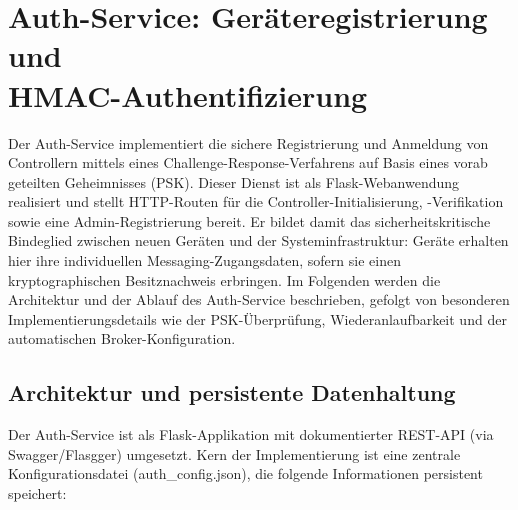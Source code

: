 \section{Auth-Service: Geräteregistrierung und \\HMAC-Authentifizierung}
Der Auth-Service implementiert die sichere Registrierung und Anmeldung von Controllern mittels eines Challenge-Response-Verfahrens auf Basis eines vorab geteilten Geheimnisses (PSK). Dieser Dienst ist als Flask-Webanwendung realisiert und stellt HTTP-Routen für die Controller-Initialisierung, -Verifikation sowie eine Admin-Registrierung bereit. Er bildet damit das sicherheitskritische Bindeglied zwischen neuen Geräten und der Systeminfrastruktur: 
Geräte erhalten hier ihre individuellen Messaging-Zugangsdaten, sofern sie einen kryptographischen Besitznachweis erbringen. Im Folgenden werden die Architektur und der Ablauf des Auth-Service beschrieben, gefolgt von besonderen Implementierungsdetails wie der PSK-Überprüfung, Wiederanlaufbarkeit und der automatischen Broker-Konfiguration.
\subsection{Architektur und persistente Datenhaltung}
Der Auth-Service ist als Flask-Applikation mit dokumentierter REST-API (via Swagger/Flasgger) umgesetzt. Kern der Implementierung ist eine zentrale Konfigurationsdatei (auth\_config.json), die folgende Informationen persistent speichert:

